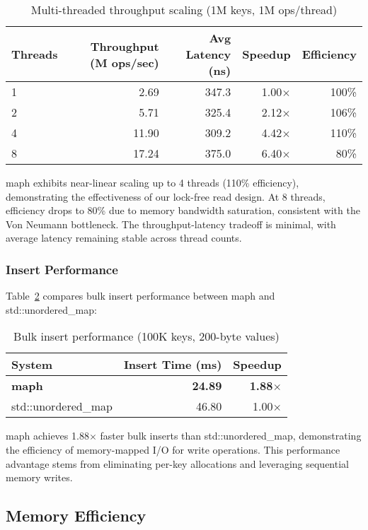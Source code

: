 \documentclass[10pt,conference]{IEEEtran}
\begin{document}
\begin{table}[htbp]
\centering
\caption{Multi-threaded throughput scaling (1M keys, 1M ops/thread)}
\label{tab:throughput}
\begin{tabular}{lrrrr}
\toprule
Threads & Throughput (M ops/sec) & Avg Latency (ns) & Speedup & Efficiency \\
\midrule
1 & 2.69 & 347.3 & 1.00$\times$ & 100\% \\
2 & 5.71 & 325.4 & 2.12$\times$ & 106\% \\
4 & 11.90 & 309.2 & 4.42$\times$ & 110\% \\
8 & 17.24 & 375.0 & 6.40$\times$ & 80\% \\
\bottomrule
\end{tabular}
\end{table}

maph exhibits near-linear scaling up to 4 threads (110\% efficiency), demonstrating the effectiveness of our lock-free read design. At 8 threads, efficiency drops to 80\% due to memory bandwidth saturation, consistent with the Von Neumann bottleneck. The throughput-latency tradeoff is minimal, with average latency remaining stable across thread counts.

\subsubsection{Insert Performance}

Table~\ref{tab:insert} compares bulk insert performance between maph and std::unordered\_map:

\begin{table}[htbp]
\centering
\caption{Bulk insert performance (100K keys, 200-byte values)}
\label{tab:insert}
\begin{tabular}{lrr}
\toprule
System & Insert Time (ms) & Speedup \\
\midrule
\textbf{maph} & \textbf{24.89} & \textbf{1.88$\times$} \\
std::unordered\_map & 46.80 & 1.00$\times$ \\
\bottomrule
\end{tabular}
\end{table}

maph achieves 1.88$\times$ faster bulk inserts than std::unordered\_map, demonstrating the efficiency of memory-mapped I/O for write operations. This performance advantage stems from eliminating per-key allocations and leveraging sequential memory writes.

\subsection{Memory Efficiency}
\end{document}
